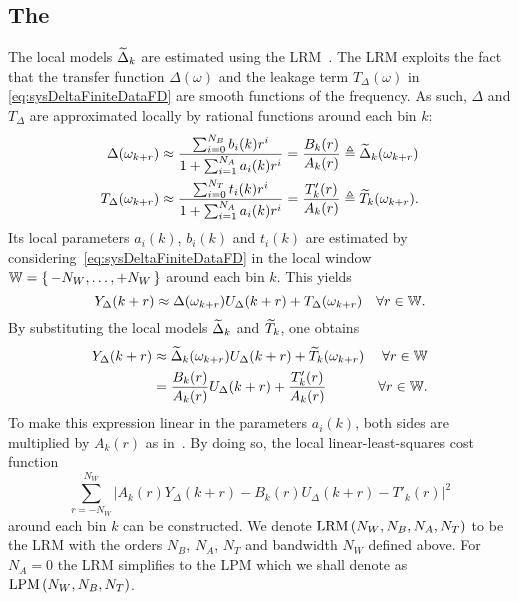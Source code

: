 \subsection{The }
\label{sec:LRM}
The local models $\widetilde{\Delta}_k$ are estimated using the \gls{LRM}~\citep{McKelvey2012LRM}.
The \gls{LRM} exploits the fact that the transfer function $\Delta(\omega)$ and the leakage term $T_{\Delta}(\omega)$  in \eqref{eq:sysDeltaFiniteDataFD} are smooth functions of the frequency.
As such, $\Delta$ and $T_{\Delta}$ are approximated locally by rational functions around each bin $k$:
\begin{align}
  \Delta(\omega_{k+r})     
    &\approx 
        \frac{\sum_{i=0}^{N_{B}} b_{i}(k) r^{i}}{1 + \sum_{i=1}^{N_{A}} a_{i}(k) r^{i}} 
      = 
        \frac{B_k(r)}{A_k(r)} 
      \triangleq 
        \widetilde{\Delta}_{k}(\omega_{k+r})
      \label{eq:LRMTaylorSystem} \\
  T_{\Delta}(\omega_{k+r}) 
    &\approx 
        \frac{\sum_{i=0}^{N_{T}} t_{i}(k) r^{i}}{1 + \sum_{i=1}^{N_{A}} a_{i}(k) r^{i}}  
      = 
        \frac{T_k'(r)}{A_k(r)} 
      \triangleq 
        \widetilde{T}_{k}(\omega_{k+r})
  \label{eq:LRMTaylorTransient}
  \text{.}
\end{align}
Its local parameters $a_{i}(k)$, $b_{i}(k)$ and $t_{i}(k)$ are estimated by considering~\eqref{eq:sysDeltaFiniteDataFD} in the local window $\mathbb{W} = \set{-N_W,\ldots,+N_W}$ around each bin $k$.
This yields
\begin{equation}
  Y_{\Delta}(k+r) 
                 \approx
                    \Delta(\omega_{k+r}) U_{\Delta}(k+r) 
                    + T_{\Delta}(\omega_{k+r}) 
    \quad
    \forall r \in \mathbb{W}
    \text{.}
    \label{eq:LocalWindowSpectra}
\end{equation}
By substituting the local models $\widetilde{\Delta}_k$ and $\widetilde{T}_k$, one obtains
\begin{align}
  Y_{\Delta}(k+r) 
                  & \approx
                    \widetilde{\Delta}_k(\omega_{k+r}) U_{\Delta}(k+r) 
                    + \widetilde{T}_k(\omega_{k+r}) 
                    & \forall r \in \mathbb{W} \\
                  & = 
                    \frac{B_k(r)}{A_k(r)} U_{\Delta}(k+r) 
                    + 
                    \frac{T'_k(r)}{A_k(r)} 
                    & \forall r \in \mathbb{W}
    \text{.}
    \label{eq:LocalWindowSpectraLRM}
\end{align}
To make this expression linear in the parameters $a_i(k)$, both sides are multiplied by $A_k(r)$ as in~\citep{Levy1959}.
By doing so, the local linear-least-squares cost function
\begin{equation}
  \sum_{r=-N_W}^{N_W} 
  \left| 
    A_k(r) Y_{\Delta}(k+r) - B_k(r) U_{\Delta}(k+r) - T'_{k}(r)
  \right|^2
  \label{eq:localCostLRM}
\end{equation}
 around each bin $k$ can be constructed.
We denote $\mathrm{LRM} \left( N_W,N_B,N_A,N_T \right) $ to be the \gls{LRM} with the orders $N_B$, $N_A$, $N_T$ and bandwidth $N_W$ defined above.
For $N_A=0$ the \gls{LRM} simplifies to the \gls{LPM} which we shall denote as $\mathrm{LPM} \left( N_W,N_B,N_T \right) $.

